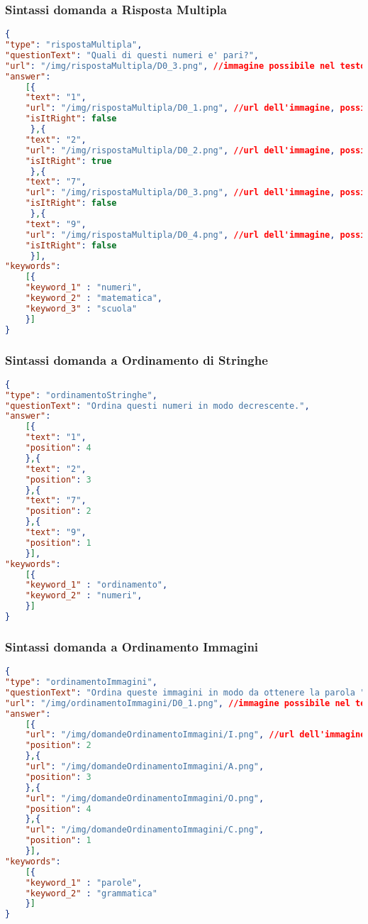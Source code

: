\subsubsection{Sintassi domanda a Risposta Multipla}
\begin{lstlisting}[language=json,firstnumber=1]
{	
"type": "rispostaMultipla",
"questionText": "Quali di questi numeri e' pari?",
"url": "/img/rispostaMultipla/D0_3.png", //immagine possibile nel testo della domanda risposta multipla
"answer":
	[{
	"text": "1",
	"url": "/img/rispostaMultipla/D0_1.png", //url dell'immagine, possibile campo facoltativo
	"isItRight": false
	 },{
	"text": "2",
	"url": "/img/rispostaMultipla/D0_2.png", //url dell'immagine, possibile campo facoltativo
	"isItRight": true
	 },{
	"text": "7",
	"url": "/img/rispostaMultipla/D0_3.png", //url dell'immagine, possibile campo facoltativo
	"isItRight": false
	 },{
	"text": "9",
	"url": "/img/rispostaMultipla/D0_4.png", //url dell'immagine, possibile campo facoltativo
	"isItRight": false
	 }],
"keywords":
	[{
	"keyword_1" : "numeri",
	"keyword_2" : "matematica",
	"keyword_3" : "scuola"
	}]
}
\end{lstlisting}

\subsubsection{Sintassi domanda a Ordinamento di Stringhe}
\begin{lstlisting}[language=json,firstnumber=1]
{
"type": "ordinamentoStringhe",
"questionText": "Ordina questi numeri in modo decrescente.",
"answer":
	[{
	"text": "1",
	"position": 4
	},{
	"text": "2",
	"position": 3
	},{
	"text": "7",
	"position": 2
	},{
	"text": "9",
	"position": 1
	}],
"keywords":
	[{
	"keyword_1" : "ordinamento",
	"keyword_2" : "numeri",
	}]
}
\end{lstlisting}

\subsubsection{Sintassi domanda a Ordinamento Immagini}
\begin{lstlisting}[language=json,firstnumber=1]
{
"type": "ordinamentoImmagini",
"questionText": "Ordina queste immagini in modo da ottenere la parola "CIAO".",
"url": "/img/ordinamentoImmagini/D0_1.png", //immagine possibile nel testo della domanda ad ordianamento di immagini
"answer":
	[{
	"url": "/img/domandeOrdinamentoImmagini/I.png", //url dell'immagine
	"position": 2
	},{
	"url": "/img/domandeOrdinamentoImmagini/A.png",
	"position": 3
	},{
	"url": "/img/domandeOrdinamentoImmagini/O.png",
	"position": 4
	},{
	"url": "/img/domandeOrdinamentoImmagini/C.png",
	"position": 1
	}],
"keywords":
	[{
	"keyword_1" : "parole",
	"keyword_2" : "grammatica"
	}]
}
\end{lstlisting}

